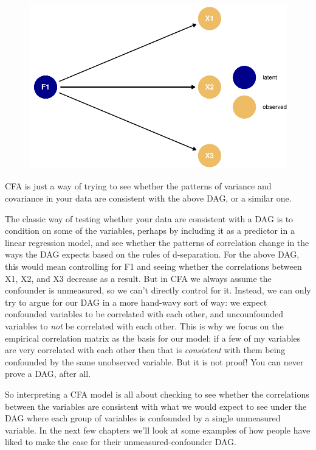 \documentclass[
  letterpaper,
  DIV=11,
  numbers=noendperiod]{scrreprt}
\begin{document}
\begin{figure}[H]

{\centering \includegraphics{./cfa-intro_files/figure-pdf/unnamed-chunk-2-1.pdf}

}

\end{figure}

CFA is just a way of trying to see whether the patterns of variance and
covariance in your data are consistent with the above DAG, or a similar
one.

The classic way of testing whether your data are consistent with a DAG
is to condition on some of the variables, perhaps by including it as a
predictor in a linear regression model, and see whether the patterns of
correlation change in the ways the DAG expects based on the rules of
d-separation. For the above DAG, this would mean controlling for F1 and
seeing whether the correlations between X1, X2, and X3 decrease as a
result. But in CFA we always assume the confounder is unmeasured, so we
can't directly control for it. Instead, we can only try to argue for our
DAG in a more hand-wavy sort of way: we expect confounded variables to
be correlated with each other, and uncounfounded variables to \emph{not}
be correlated with each other. This is why we focus on the empirical
correlation matrix as the basis for our model: if a few of my variables
are very correlated with each other then that is \emph{consistent} with
them being confounded by the same unobserved variable. But it is not
proof! You can never prove a DAG, after all.

So interpreting a CFA model is all about checking to see whether the
correlations between the variables are consistent with what we would
expect to see under the DAG where each group of variables is confounded
by a single unmeasured variable. In the next few chapters we'll look at
some examples of how people have liked to make the case for their
unmeasured-confounder DAG.
\end{document}
